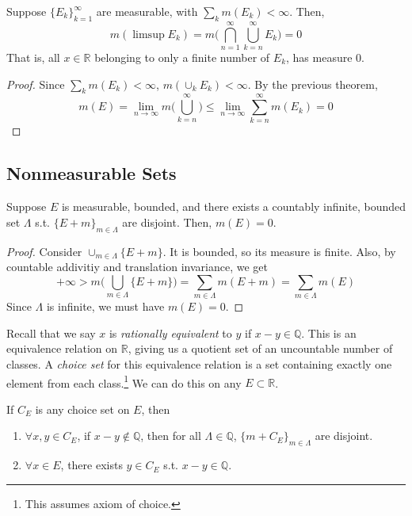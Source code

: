   \begin{lemma}
    Suppose $\{E_k\}_{k=1}^\infty$ are measurable, with $\sum_{k} m(E_k) < \infty$. Then, 
    \begin{equation}
      m(\limsup E_k) = m\bigg( \bigcap_{n=1}^\infty \bigcup_{k=n}^\infty E_k \bigg) = 0
    \end{equation}
    That is, all $x \in \mathbb{R}$ belonging to only a finite number of $E_k$, has measure $0$. 
  \end{lemma}
  \begin{proof}
    Since $\sum_k m(E_k) < \infty$, $m ( \cup_k E_k) < \infty$. By the previous theorem, 
    \begin{equation}
      m(E) = \lim_{n \to \infty} m \bigg( \bigcup_{k=n}^\infty \bigg) \leq \lim_{n \to \infty} \sum_{k=n}^\infty m(E_k) = 0
    \end{equation}
  \end{proof}

\subsection{Nonmeasurable Sets} 

  \begin{lemma}
    Suppose $E$ is measurable, bounded, and there exists a countably infinite, bounded set $\Lambda$ s.t. $\{E + m\}_{m\in \Lambda}$ are disjoint. Then, $m(E) = 0$. 
  \end{lemma}
  \begin{proof}
    Consider $\cup_{m\in \Lambda} \{E + m\}$. It is bounded, so its measure is finite. Also, by countable addivitiy and translation invariance, we get 
    \begin{equation}
      +\infty > m \bigg( \bigcup_{m\in \Lambda} \{E + m\} \bigg) = \sum_{m\in \Lambda} m (E + m) = \sum_{m\in \Lambda} m(E)
    \end{equation}
    Since $\Lambda$ is infinite, we must have $m(E) = 0$. 
  \end{proof}

  Recall that we say $x$ is \textit{rationally equivalent} to $y$ if $x - y \in \mathbb{Q}$. This is an equivalence relation on $\mathbb{R}$, giving us a quotient set of an uncountable number of classes. A \textit{choice set} for this equivalence relation is a set containing exactly one element from each class.\footnote{This assumes axiom of choice.} We can do this on any $E \subset \mathbb{R}$. 

  \begin{lemma} 
    If $C_E$ is any choice set on $E$, then 
    \begin{enumerate}
      \item $\forall x, y \in C_E$, if $x - y \not\in \mathbb{Q}$, then for all $\Lambda \in \mathbb{Q}$, $\{m+ C_E\}_{m\in \Lambda}$ are disjoint. 
      \item $\forall x \in E$, there exists $y \in C_E$ s.t. $x - y \in \mathbb{Q}$. 
    \end{enumerate}
  \end{lemma}

